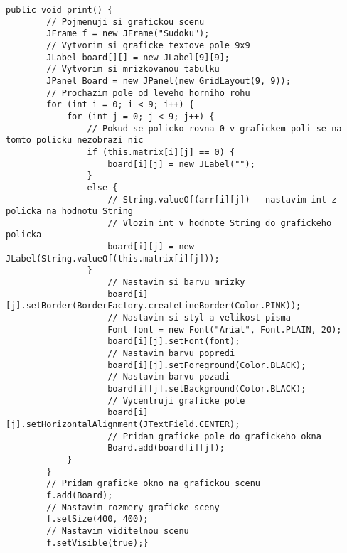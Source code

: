 \begin{small}
\begin{lstlisting}
public void print() {
        // Pojmenuji si grafickou scenu
        JFrame f = new JFrame("Sudoku");
        // Vytvorim si graficke textove pole 9x9
        JLabel board[][] = new JLabel[9][9];
        // Vytvorim si mrizkovanou tabulku
        JPanel Board = new JPanel(new GridLayout(9, 9));
        // Prochazim pole od leveho horniho rohu
        for (int i = 0; i < 9; i++) {
            for (int j = 0; j < 9; j++) {
                // Pokud se policko rovna 0 v grafickem poli se na tomto policku nezobrazi nic
                if (this.matrix[i][j] == 0) {
                    board[i][j] = new JLabel("");
                }
                else {
                    // String.valueOf(arr[i][j]) - nastavim int z policka na hodnotu String
                    // Vlozim int v hodnote String do grafickeho policka
                    board[i][j] = new JLabel(String.valueOf(this.matrix[i][j]));
                }
                    // Nastavim si barvu mrizky
                    board[i][j].setBorder(BorderFactory.createLineBorder(Color.PINK));
                    // Nastavim si styl a velikost pisma
                    Font font = new Font("Arial", Font.PLAIN, 20);
                    board[i][j].setFont(font);
                    // Nastavim barvu popredi
                    board[i][j].setForeground(Color.BLACK);
                    // Nastavim barvu pozadi
                    board[i][j].setBackground(Color.BLACK);
                    // Vycentruji graficke pole
                    board[i][j].setHorizontalAlignment(JTextField.CENTER);
                    // Pridam graficke pole do grafickeho okna
                    Board.add(board[i][j]);
            }
        }
        // Pridam graficke okno na grafickou scenu
        f.add(Board);
        // Nastavim rozmery graficke sceny
        f.setSize(400, 400);
        // Nastavim viditelnou scenu
        f.setVisible(true);}
\end{lstlisting}
\end{small}
